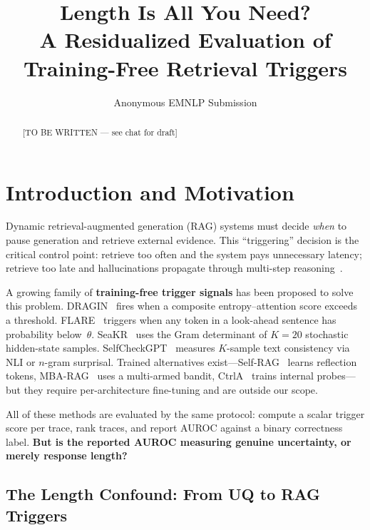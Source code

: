 \documentclass[11pt]{article}
\title{Length Is All You Need? \\
A Residualized Evaluation of Training-Free Retrieval Triggers}
\author{Anonymous EMNLP Submission}
\date{}
\begin{document}
\maketitle

\begin{abstract}
[TO BE WRITTEN — see chat for draft]
\end{abstract}


\section{Introduction and Motivation}

Dynamic retrieval-augmented generation (RAG) systems must decide
\emph{when} to pause generation and retrieve external evidence.
This ``triggering'' decision is the critical control point:
retrieve too often and the system pays unnecessary latency;
retrieve too late and hallucinations propagate through multi-step
reasoning~\citep{Su_DRAGIN, Jiang_FLARE, Trivedi_IRCoT}.

A growing family of \textbf{training-free trigger signals} has been
proposed to solve this problem. DRAGIN~\citep{Su_DRAGIN} fires when
a composite entropy--attention score exceeds a threshold.
FLARE~\citep{Jiang_FLARE} triggers when any token in a look-ahead
sentence has probability below~$\theta$.
SeaKR~\citep{Yao_SeaKR} uses the Gram determinant of $K{=}20$
stochastic hidden-state samples.
SelfCheckGPT~\citep{Manakul_SelfCheckGPT} measures $K$-sample text
consistency via NLI or $n$-gram surprisal.
Trained alternatives exist---Self-RAG~\citep{Asai_SelfRAG} learns
reflection tokens, MBA-RAG~\citep{Tang_MBARAG} uses a multi-armed
bandit, CtrlA~\citep{Liu_CtrlA} trains internal probes---but they
require per-architecture fine-tuning and are outside our scope.

All of these methods are evaluated by the same protocol: compute a
scalar trigger score per trace, rank traces, and report AUROC against
a binary correctness label. \textbf{But is the reported AUROC
measuring genuine uncertainty, or merely response length?}

\subsection{The Length Confound: From UQ to RAG Triggers}
\end{document}
